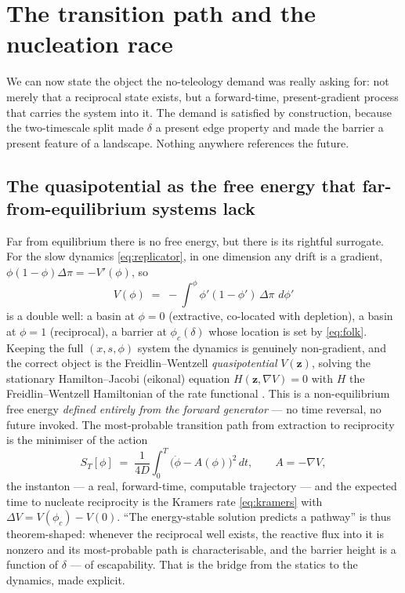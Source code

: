 \documentclass[11pt]{article}
\theoremstyle{plain}
\theoremstyle{definition}
\begin{document}
\section{The transition path and the nucleation race}
\label{sec:nucleation}

We can now state the object the no-teleology demand was really asking for: not merely that a reciprocal state exists, but a forward-time, present-gradient process that carries the system into it. The demand is satisfied by construction, because the two-timescale split made $\delta$ a present edge property and made the barrier a present feature of a landscape. Nothing anywhere references the future.

\subsection{The quasipotential as the free energy that far-from-equilibrium systems lack}

Far from equilibrium there is no free energy, but there is its rightful surrogate. For the slow dynamics \eqref{eq:replicator}, in one dimension any drift is a gradient, $\phi(1-\phi)\Delta\pi = -V'(\phi)$, so
\begin{equation}
V(\phi) \;=\; -\!\int^{\phi}\!\!\phi'(1-\phi')\,\Delta\pi\,\,d\phi'
\label{eq:1dpot}
\end{equation}
is a double well: a basin at $\phi = 0$ (extractive, co-located with depletion), a basin at $\phi = 1$ (reciprocal), a barrier at $\phi_c(\delta)$ whose location is set by \eqref{eq:folk}. Keeping the full $(x,s,\phi)$ system the dynamics is genuinely non-gradient, and the correct object is the Freidlin--Wentzell \emph{quasipotential} $V(\mathbf z)$, solving the stationary Hamilton--Jacobi (eikonal) equation $H(\mathbf z, \nabla V) = 0$ with $H$ the Freidlin--Wentzell Hamiltonian of the rate functional \cite{freidlinwentzell,kramers1940}. This is a non-equilibrium free energy \emph{defined entirely from the forward generator} --- no time reversal, no future invoked. The most-probable transition path from extraction to reciprocity is the minimiser of the action
\begin{equation}
S_T[\phi] \;=\; \frac{1}{4D}\int_0^T \big(\dot\phi - A(\phi)\big)^2\,dt, \qquad A = -\nabla V,
\label{eq:action}
\end{equation}
the instanton --- a real, forward-time, computable trajectory --- and the expected time to nucleate reciprocity is the Kramers rate \eqref{eq:kramers} with $\Delta V = V(\phi_c) - V(0)$. ``The energy-stable solution predicts a pathway'' is thus theorem-shaped: whenever the reciprocal well exists, the reactive flux into it is nonzero and its most-probable path is characterisable, and the barrier height is a function of $\delta$ --- of escapability. That is the bridge from the statics to the dynamics, made explicit.
\end{document}
